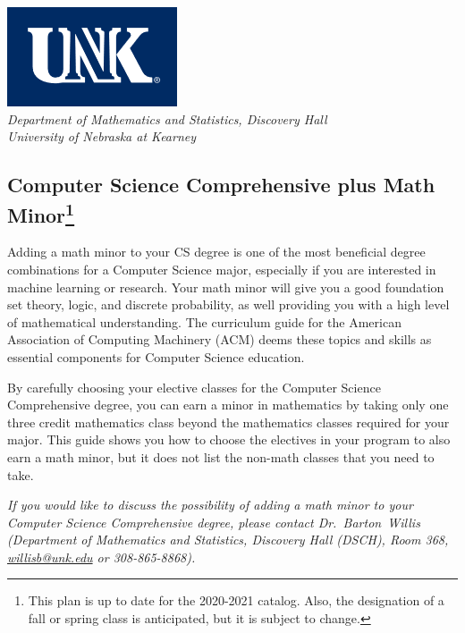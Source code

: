 \documentclass[10pt]{article}
\makeatletter
\newcommand{\contactbw}{\mbox{Dr.\ Barton Willis} (Department of Mathematics and Statistics,  Discovery Hall (DSCH), Room 368,
\href{mailto:willisb@unk.edu}{willisb@unk.edu} or 308-865-8868)}
\makeatother
\begin{document}
\begin{flushleft}
\includegraphics[scale=0.25]{unk-logo}\\
 \emph{\textcolor{unkblue}{Department of Mathematics and Statistics, Discovery Hall}} \\
  \emph{\textcolor{unkblue}{University of Nebraska at Kearney}}
\end{flushleft}


\subsection*{\textbf{\textcolor{unkblue}{Computer Science Comprehensive plus Math Minor\footnote[1]{This plan is up to date for the 2020-2021 catalog. Also, the designation of a fall or spring class is anticipated, but it is subject to change.
}}}}


Adding a math minor to your CS degree is one of the most beneficial degree combinations for a Computer Science major, especially if you are interested in machine learning or research.  Your math minor will give you a good foundation set theory, logic, and discrete probability, as well providing you with a high level of mathematical understanding.
The curriculum guide for the American Association of Computing Machinery (ACM) deems  these topics and skills  as essential components for  Computer Science education.

 By carefully choosing your elective classes for the Computer Science Comprehensive degree, you can earn a minor in mathematics by taking only one three credit mathematics class beyond the mathematics classes required for your major.  This guide shows you how to choose the electives in your program to also earn a math minor, but it does not list the non-math classes that you need to take.

 \textcolor{unkblue}{\emph{If you would like to discuss the possibility of  adding a math minor to your Computer Science Comprehensive degree, please contact \contactbw.}}

\vspace{-0.1in}
\end{document}
